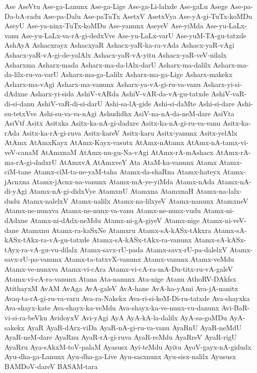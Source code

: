 {Ase
AseVtu
Ase-ga-Lanunx
Ase-ga-Lige
Ase-ga-Li-lalxde
Ase-gaLu
Asege
Ase-pa-Da-bA-radu
Ase-pa-Dalu
Ase-paTuTx
AsetxV
AsetxVya
Ase-yA-gi-TuTx-koMDu
AseyU
Ase-ya-ninx-TuTx-koMDu
Ase-yanunx
AseyeV
Ase-yiMda
Ase-yu-LaLx-vanu
Ase-yu-LaLx-va-rA-gi-dedxVve
Ase-yu-LaLx-varU
Ase-yuM-TA-gu-tatxde
AshAyA
Ashacxrayx
AshacxyaR
Ashacx-yaR-ka-ra-vAda
Ashacx-yaR-vAgi
Ashacx-yaR-vA-gi-de-yalAlx
Ashacx-yaR-vA-yitu
Ashacx-yaR-veV-nilalx
Asharxma
Asharx-mada
Asharx-ma-da-lAlx-darU
Asharx-ma-dalilx
Asharx-ma-da-lilx-ru-va-varU
Asharx-ma-ga-Lalilx
Asharx-ma-ga-Lige
Asharx-makekx
Asharx-ma-vAgi
Asharx-ma-vanunx
Asharx-ya-vA-gi-ru-va-vanu
Asharx-yi-si-dAdxne
Asharx-yi-sida
AshiV-vARda
AshiV-vAR-da-vA-gu-tatxde
AshiV-vaR-di-si-danu
AshiV-vaR-di-si-darU
Ashi-sa-lA-gide
Ashi-si-daMte
Ashi-si-dare
Ashi-su-tetxVve
Ashi-su-va-va-nAgi
Ashudidhx
AsiV-na-nA-da-neM-dare
AsiVta
AsiVtf
Asitx
Asitxka
Asitx-ka-nA-gi-dadxre
Asitx-ka-nA-gi-ru-va-vanu
Asitx-ka-rAda
Asitx-ka-rA-gi-ruva
Asitx-kareV
Asitx-karu
Asitx-yanunx
Asitx-yelAlx
AtAmx
AtAmxKayx
AtAmx-Kayx-vasutx
AtAmx-nAtamx
AtAmx-nA-tamx-vi-veV-canaM
AtAmxnaM
AtAmx-nu-gu-Na-vAgi
AtAmx-rA-mAshacx
AtAmx-rA-ma-rA-gi-dadxrU
AtAmxvA
AtAmxveY
Ata
AtaM-ka-vanunx
Atamx
Atamx-ciM-tane
Atamx-ciM-ta-ne-yaM-taha
Atamx-da-shaRna
Atamx-hateyx
Atamx-jAcnxna
Atamx-jAcnx-na-vanunx
Atamx-mA-ye-yiMda
Atamx-nAda
Atamx-nA-di-yAgi
Atamx-nA-gi-didxVye
AtamxnU
Atamxna
AtamxnaH
Atamx-na-lalx-dudu
Atamx-nalelxV
Atamx-nalilx
Atamx-na-lilxyeV
Atamx-nanunx
AtamxneV
Atamx-ne-nunxva
Atamx-ne-nunx-va-vanu
Atamx-ne-nunx-vudu
Atamx-ni-dAdxne
Atamx-ni-dAdx-neMdu
Atamx-ni-gA-giyeV
Atamx-nige
Atamx-ni-veV-dane
Atamxnu
Atamx-ra-kaSxNe
Atamxru
Atamx-sA-kASx-tAkxra
Atamx-sA-kASx-tAkx-ra-vA-gu-tatxde
Atamx-sA-kASx-tAkx-ra-vanunx
Atamx-sA-kASx-tAyx-ra-vA-gu-vu-dilalx
Atamx-savx-rU-pada
Atamx-savx-rU-pa-dalelxV
Atamx-savx-rU-pa-vanunx
Atamx-ta-tatxvX-vanunx
Atamx-vanunx
Atamx-veMdu
Atamx-ve-nunxva
Atamx-vi-cAra
Atamx-vi-cA-ra-mA-Du-titx-ru-vA-galeV
Atamx-vi-cA-ra-vanunx
Atana
Ata-nanunx
Ata-nige
Atanu
AthoRV-DAkfsx
AtithayxM
AvAM
AvAga
AvA-galeV
AvA-hane
AvA-ha-yAmi
Ava-jA-nanitx
Avaq-ta-rA-gi-ru-va-varu
Ava-ra-Nakekx
Ava-ri-si-koM-Di-ru-tatxde
Ava-shayxka
Ava-shayx-kate
Ava-shayx-ka-veMdu
Ava-shayx-ka-ve-nunx-vu-danunx
Avi-BaR-vi-si-ra-beVku
AvidoyxV
Avi-yAgi
AyA
AyA-kA-la-dalilx
AyA-sa-goMDu
AyA-sakekx
AyaR
AyaR-dArx-viDa
AyaR-nA-gi-ru-va-vanu
AyaRnU
AyaR-neMdU
AyaR-neM-dare
AyaRnu
AyaR-rA-gi-ruva
AyaR-reMdu
AyaRreV
AyaR-rigU
AyaRru
Aya-sAkxM-toV-palaM
Ayasusx
Ayi-teMdu
Ayitu
AyoV-gayx-nA-gidudx
Ayu-dha-ga-Lanunx
Ayu-dha-ga-Live
Ayu-sasxnunx
Ayu-sisx-nalilx
Ayususx
BAMDoV-dareV
BASAM-tara
}
